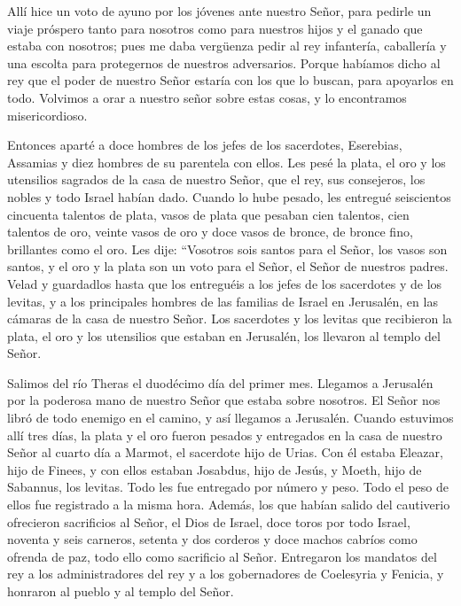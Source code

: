  Allí hice un voto de ayuno por los jóvenes ante nuestro
Señor, para pedirle un viaje próspero tanto para nosotros como para
nuestros hijos y el ganado que estaba con nosotros;  pues
me daba vergüenza pedir al rey infantería, caballería y una escolta para
protegernos de nuestros adversarios.  Porque habíamos
dicho al rey que el poder de nuestro Señor estaría con los que lo
buscan, para apoyarlos en todo.  Volvimos a orar a
nuestro señor sobre estas cosas, y lo encontramos misericordioso.

 Entonces aparté a doce hombres de los jefes de los
sacerdotes, Eserebias, Assamias y diez hombres de su parentela con
ellos.  Les pesé la plata, el oro y los utensilios
sagrados de la casa de nuestro Señor, que el rey, sus consejeros, los
nobles y todo Israel habían dado.  Cuando lo hube pesado,
les entregué seiscientos cincuenta talentos de plata, vasos de plata que
pesaban cien talentos, cien talentos de oro,  veinte
vasos de oro y doce vasos de bronce, de bronce fino, brillantes como el
oro.  Les dije: ``Vosotros sois santos para el Señor, los
vasos son santos, y el oro y la plata son un voto para el Señor, el
Señor de nuestros padres.  Velad y guardadlos hasta que
los entreguéis a los jefes de los sacerdotes y de los levitas, y a los
principales hombres de las familias de Israel en Jerusalén, en las
cámaras de la casa de nuestro Señor.  Los sacerdotes y
los levitas que recibieron la plata, el oro y los utensilios que estaban
en Jerusalén, los llevaron al templo del Señor.

 Salimos del río Theras el duodécimo día del primer mes.
Llegamos a Jerusalén por la poderosa mano de nuestro Señor que estaba
sobre nosotros. El Señor nos libró de todo enemigo en el camino, y así
llegamos a Jerusalén.  Cuando estuvimos allí tres días,
la plata y el oro fueron pesados y entregados en la casa de nuestro
Señor al cuarto día a Marmot, el sacerdote hijo de Urias.
 Con él estaba Eleazar, hijo de Finees, y con ellos
estaban Josabdus, hijo de Jesús, y Moeth, hijo de Sabannus, los levitas.
Todo les fue entregado por número y peso.  Todo el peso
de ellos fue registrado a la misma hora.  Además, los que
habían salido del cautiverio ofrecieron sacrificios al Señor, el Dios de
Israel, doce toros por todo Israel, noventa y seis carneros,
 setenta y dos corderos y doce machos cabríos como
ofrenda de paz, todo ello como sacrificio al Señor. 
Entregaron los mandatos del rey a los administradores del rey y a los
gobernadores de Coelesyria y Fenicia, y honraron al pueblo y al templo
del Señor.

